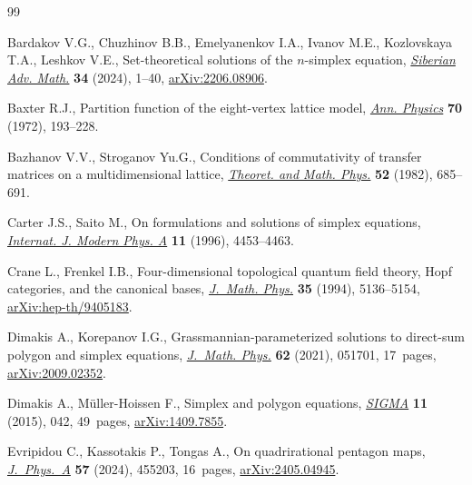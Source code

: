 \documentclass[pdftex]{sigma}
\numberwithin{equation}{section}
\theoremstyle{definition}
\begin{document}
\begin{thebibliography}{99}
\footnotesize\itemsep=0pt

Bardakov V.G., Chuzhinov B.B., Emelyanenkov I.A., Ivanov M.E., Kozlovskaya
 T.A., Leshkov V.E., Set-theoretical solutions of the {$n$}-simplex equation,
 \href{https://doi.org/10.1134/s1055134424010012}{\textit{Siberian Adv.
 Math.}} \textbf{34} (2024), 1--40,
 \href{https://arxiv.org/abs/2206.08906}{arXiv:2206.08906}.

Baxter R.J., Partition function of the eight-vertex lattice model,
 \href{https://doi.org/10.1016/0003-4916(72)90335-1}{\textit{Ann. Physics}}
 \textbf{70} (1972), 193--228.

Bazhanov V.V., Stroganov Yu.G., Conditions of commutativity of transfer matrices
 on a multidimensional lattice,
 \href{https://doi.org/10.1007/BF01027789}{\textit{Theoret. and Math. Phys.}}
 \textbf{52} (1982), 685--691.

Carter J.S., Saito M., On formulations and solutions of simplex equations,
 \href{https://doi.org/10.1142/S0217751X96002066}{\textit{Internat. J. Modern
 Phys. A}} \textbf{11} (1996), 4453--4463.

Crane L., Frenkel I.B., Four-dimensional topological quantum field theory,
 {H}opf categories, and the canonical bases,
 \href{https://doi.org/10.1063/1.530746}{\textit{J.~Math. Phys.}} \textbf{35}
 (1994), 5136--5154,
 \href{https://arxiv.org/abs/hep-th/9405183}{arXiv:hep-th/9405183}.

Dimakis A., Korepanov I.G., Grassmannian-parameterized solutions to direct-sum
 polygon and simplex equations,
 \href{https://doi.org/10.1063/5.0035760}{\textit{J.~Math. Phys.}} \textbf{62}
 (2021), 051701, 17~pages,
 \href{https://arxiv.org/abs/2009.02352}{arXiv:2009.02352}.

Dimakis A., M\"{u}ller-Hoissen F., Simplex and polygon equations,
 \href{https://doi.org/10.3842/SIGMA.2015.042}{\textit{SIGMA}} \textbf{11}
 (2015), 042, 49~pages,
 \href{https://arxiv.org/abs/1409.7855}{arXiv:1409.7855}.

Evripidou C., Kassotakis P., Tongas A., On quadrirational pentagon maps,
 \href{https://doi.org/10.1088/1751-8121/ad85b1}{\textit{J.~Phys.~A}}
 \textbf{57} (2024), 455203, 16~pages,
 \href{https://arxiv.org/abs/2405.04945}{arXiv:2405.04945}.


\end{thebibliography}
\end{document}
